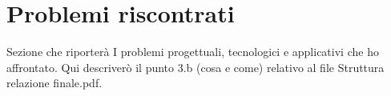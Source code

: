 \section{Problemi riscontrati}

Sezione che riporterà I problemi progettuali, tecnologici e applicativi che ho affrontato.
Qui descriverò il punto 3.b (cosa e come) relativo al file Struttura relazione finale.pdf.



